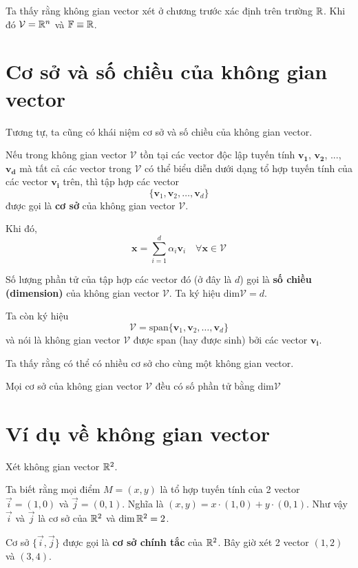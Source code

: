 Ta thấy rằng không gian vector xét ở chương trước xác định trên trường $\mathbb{R}$.
Khi đó $\mathcal{V} = \mathbb{R}^n$ và $\mathbb{F} \equiv \mathbb{R}$.

\section{Cơ sở và số chiều của không gian vector}

Tương tự, ta cũng có khái niệm cơ sở và số chiều của không gian vector.

Nếu trong không gian vector $\mathcal{V}$ tồn tại các vector độc lập tuyến tính $\bm{v_1}$, $\bm{v_2}$, ..., $\bm{v_d}$
mà tất cả các vector trong $\mathcal{V}$ có thể biểu diễn dưới dạng tổ hợp tuyến tính của các vector $\bm{v_i}$ trên,
thì tập hợp các vector 
\[\{ \bm{v}_1, \bm{v}_2, \ldots, \bm{v}_d \}\]
được gọi là \textbf{cơ sở} của không gian vector $\mathcal{V}$.

Khi đó,
\[\bm{x} = \sum_{i=1}^{d} \alpha_i \bm{v}_i \quad \forall \bm{x} \in \mathcal{V}\]

Số lượng phần tử của tập hợp các vector đó (ở đây là $d$) gọi là \textbf{số chiều (dimension)} của không gian vector $\mathcal{V}$.
Ta ký hiệu $\text{dim} \mathcal{V} = d$.

Ta còn ký hiệu 
\[\mathcal{V} = \text{span} \{\bm{v}_1, \bm{v}_2, \ldots, \bm{v}_d\}\]
và nói là không gian vector $\mathcal{V}$ được span (hay được sinh) bởi các vector $\bm{v_i}$.

Ta thấy rằng có thể có nhiều cơ sở cho cùng một không gian vector.

\begin{theorem}
    Mọi cơ sở của không gian vector $\mathcal{V}$ đều có số phần tử bằng $\text{dim} \mathcal{V}$
\end{theorem}

\section{Ví dụ về không gian vector}

Xét không gian vector $\mathbb{R}^2$.

Ta biết rằng mọi điểm $M = (x, y)$ là tổ hợp tuyến tính 
của 2 vector $\vec{i} = (1, 0)$ và $\vec{j} = (0, 1)$.
Nghĩa là $(x, y) = x \cdot (1, 0) + y \cdot(0, 1)$. Như vậy $\vec{i}$
và $\vec{j}$ là cơ sở của $\mathbb{R}^2$ và $\dim \mathbb{R}^2 = 2$.

Cơ sở $\{\vec{i}, \vec{j}\}$ được gọi là \textbf{cơ sở chính tắc}
của $\mathbb{R}^2$. Bây giờ xét 2 vector $(1, 2)$ và $(3, 4)$.


